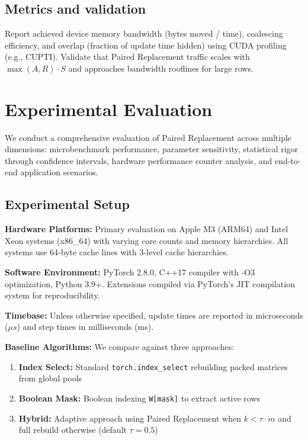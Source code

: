 \documentclass{article}
\numberwithin{equation}{section}
\theoremstyle{plain}
\theoremstyle{definition}
\theoremstyle{remark}
\begin{document}
\subsection{Metrics and validation}

Report achieved device memory bandwidth (bytes moved / time), coalescing efficiency, and overlap (fraction of update time hidden) using CUDA profiling (e.g., CUPTI). Validate that Paired Replacement traffic scales with $\max(A,R)\cdot S$ and approaches bandwidth rooflines for large rows.

\section{Experimental Evaluation} \label{sec:evaluation}

We conduct a comprehensive evaluation of Paired Replacement across multiple dimensions: microbenchmark performance, parameter sensitivity, statistical rigor through confidence intervals, hardware performance counter analysis, and end-to-end application scenarios.

\subsection{Experimental Setup}

\textbf{Hardware Platforms:} Primary evaluation on Apple M3 (ARM64) and Intel Xeon systems (x86\_64) with varying core counts and memory hierarchies. All systems use 64-byte cache lines with 3-level cache hierarchies.

\textbf{Software Environment:} PyTorch 2.8.0, C++17 compiler with -O3 optimization, Python 3.9+. Extensions compiled via PyTorch's JIT compilation system for reproducibility.

\textbf{Timebase:} Unless otherwise specified, update times are reported in microseconds ($\mu s$) and step times in milliseconds (ms).

\textbf{Baseline Algorithms:} We compare against three approaches:
\begin{enumerate}
    \item \textbf{Index Select:} Standard \texttt{torch.index\_select} rebuilding packed matrices from global pools
    \item \textbf{Boolean Mask:} Boolean indexing \texttt{W[mask]} to extract active rows  
    \item \textbf{Hybrid:} Adaptive approach using Paired Replacement when $k < \tau \cdot m$ and full rebuild otherwise (default $\tau = 0.5$)
\end{enumerate}
\end{document}
